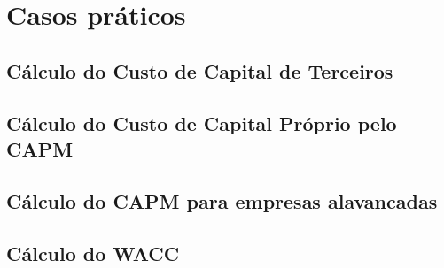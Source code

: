\documentclass[a4paper,12pt]{article}
\begin{document}
  

\section{Casos práticos}

\subsection{Cálculo do Custo de Capital de Terceiros}


\subsection{Cálculo do Custo de Capital Próprio pelo CAPM}




\subsection{Cálculo do CAPM para empresas alavancadas}




\subsection{Cálculo do WACC}
\end{document}

